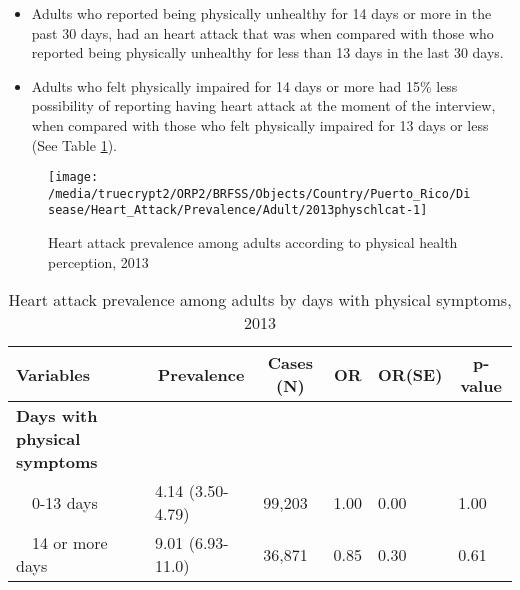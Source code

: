  
\newpage

 \newpage
\begin{itemize}

\item Adults who reported being physically unhealthy for 14 days or more in the past 30 days, had an heart attack that was 
 when compared with 
those who reported being physically unhealthy for less than 13 days in the last 30 days.


\item Adults who felt physically impaired for 14 days or more had 15\% less possibility of reporting having heart attack at the moment of the interview, when compared with those who felt physically impaired for 13 days or less (See Table \ref{tab:phys.Heart_Attack.2013}).

\end{itemize}

\begin{figure}[H]
\caption{Heart attack prevalence among adults according to physical health perception, 2013}
\label{fig:phys.Heart_Attack.2013}
\begin{knitrout}
\color{fgcolor}

{\centering \texttt{[image: /media/truecrypt2/ORP2/BRFSS/Objects/Country/Puerto\_Rico/Disease/Heart\_Attack/Prevalence/Adult/2013physchlcat-1]} 

}



\end{knitrout}
 \end{figure}

\begin{table}[H]
\caption{Heart attack prevalence among adults by days with physical symptoms, 2013\label{tab:phys.Heart_Attack.2013}} 
\begin{center}
\begin{tabular}{llllll}
\hline\hline
\multicolumn{1}{l}{Variables}&\multicolumn{1}{c}{Prevalence}&\multicolumn{1}{c}{Cases (N)}&\multicolumn{1}{c}{OR}&\multicolumn{1}{c}{OR(SE)}&\multicolumn{1}{c}{p-value}\tabularnewline
\hline
{\bfseries Days with physical symptoms}&&&&&\tabularnewline
~~0-13 days&4.14 (3.50-4.79)&99,203&1.00&0.00&1.00\tabularnewline
~~14 or more days&9.01 (6.93-11.0)&36,871&0.85&0.30&0.61\tabularnewline
\hline
\end{tabular}\end{center}

\end{table}


